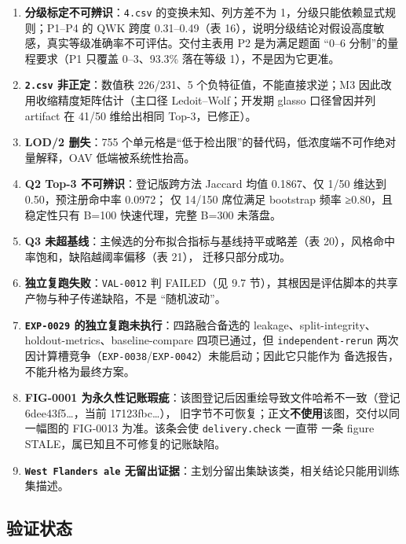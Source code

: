 \documentclass[
  a4paper,12pt]{article}
\providecommand{\tightlist}{%
  \setlength{\itemsep}{0pt}\setlength{\parskip}{0pt}}
\begin{document}
\begin{enumerate}
\def\labelenumi{\arabic{enumi}.}
\tightlist
\item
  \textbf{分级标定不可辨识}：\texttt{4.csv} 的变换未知、列方差不为
  1，分级只能依赖显式规则；P1--P4 的 QWK 跨度 0.31--0.49（表
  16），说明分级结论对假设高度敏感，真实等级准确率不可评估。交付主表用
  P2 是为满足题面 ``0--6 分制''的量程要求（P1 只覆盖 0--3、93.3\%
  落在等级 1），不是因为它更准。
\item
  \textbf{\texttt{2.csv} 非正定}：数值秩 226/231、5
  个负特征值，不能直接求逆；M3 因此改用收缩精度矩阵估计（主口径
  Ledoit--Wolf；开发期 glasso 口径曾因并列 artifact 在 41/50 维给出相同
  Top-3，已修正）。
\item
  \textbf{LOD/2 删失}：755
  个单元格是``低于检出限''的替代码，低浓度端不可作绝对量解释，OAV
  低端被系统性抬高。
\item
  \textbf{Q2 Top-3 不可辨识}：登记版跨方法 Jaccard 均值 0.1867、仅 1/50
  维达到 0.50，预注册命中率 0.0972； 仅 14/150 席位满足 bootstrap 频率
  ≥0.80，且稳定性只有 B=100 快速代理，完整 B=300 未落盘。
\item
  \textbf{Q3 未超基线}：主候选的分布拟合指标与基线持平或略差（表
  20），风格命中率饱和，缺陷越阈率偏移（表 21）， 迁移只部分成功。
\item
  \textbf{独立复跑失败}：\texttt{VAL-0012} 判 FAILED（见 9.7
  节），其根因是评估脚本的共享产物与种子传递缺陷，不是 ``随机波动''。
\item
  \textbf{\texttt{EXP-0029} 的独立复跑未执行}：四路融合备选的
  leakage、split-integrity、holdout-metrics、baseline-compare
  四项已通过，但 \texttt{independent-rerun}
  两次因计算槽竞争（\texttt{EXP-0038}/\texttt{EXP-0042}）未能启动；因此它只能作为
  备选报告，不能升格为最终方案。
\item
  \textbf{FIG-0001
  为永久性记账瑕疵}：该图登记后因重绘导致文件哈希不一致（登记
  6dee43f5\ldots，当前 17123fbc\ldots），
  旧字节不可恢复；正文\textbf{不使用}该图，交付以同一幅图的 FIG-0013
  为准。该条会使 \texttt{delivery.check} 一直带 一条 figure
  STALE，属已知且不可修复的记账缺陷。
\item
  \textbf{\texttt{West\ Flanders\ ale}
  无留出证据}：主划分留出集缺该类，相关结论只能用训练集描述。
\end{enumerate}

\subsection{验证状态}\label{ux9a8cux8bc1ux72b6ux6001}
\end{document}
